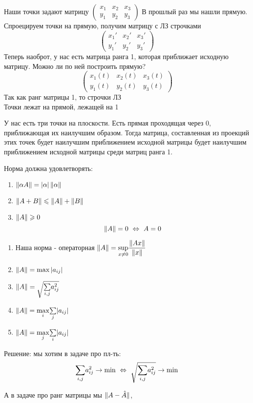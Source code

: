 \documentclass[12pt, fleqn]{article}
\begin{document}
\begin{remark}
    Наши точки задают матрицу $\begin{pmatrix}
        x_1 & x_2 & x_3\\
        y_1 & y_2 & y_3
    \end{pmatrix}$
    В прошлый раз мы нашли прямую. Спроецируем точки на прямую, получим матрицу с ЛЗ строчками
    \[\begin{pmatrix}
        x_1' & x_2' & x_3'\\
        y_1' & y_2' & y_3'
    \end{pmatrix}\]
    Теперь наоброт, у нас есть матрица ранга 1, которая приближает исходную матрицу. Можно ли по ней построить прямую?
    \[\begin{pmatrix}
        x_1(t) & x_2(t) & x_3(t)\\
        y_1(t) & y_2(t) & y_3(t)
    \end{pmatrix}\]
    Так как ранг матрицы 1, то строчки ЛЗ\\
    Точки лежат на прямой, лежащей на 1
\end{remark}

\begin{task}
    У нас есть три точки на плоскости. Есть прямая проходящая через 0, приближающая их наилучшим образом. Тогда матрица, составленная из проекций этих точек будет наилучшим приближением исходной матрицы будет наилучшим приближением исходной матрицы среди матриц ранга 1.

    Норма должна удовлетворять:
    \begin{enumerate}
      \item $\lVert \alpha A \rVert = \left|\alpha\right| \lVert \alpha \rVert$
      \item $\lVert A + B \rVert \leqslant \lVert A \rVert + \lVert B \rVert$
      \item $\lVert A \rVert \geqslant 0$
      \[\lVert A \rVert = 0 \ \Leftrightarrow\ A = 0\]
    \end{enumerate}

    \begin{enumerate}
      \item Наша норма - операторная $\lVert A \rVert = \underset{x \neq 0}{\sup} \dfrac{\lVert Ax \rVert}{\lVert x \rVert}$
      \item $\lVert A \rVert = \max \left|a_{ij}\right|$
      \item $\lVert A \rVert = \sqrt{\underset{i,j}{\sum} a_{ij}^2}$
      \item $\lVert A \rVert = \underset{i}{\max} \underset{j}{\sum} |a_{ij}|$
      \item $\lVert A \rVert = \underset{j}{\max} \underset{i}{\sum} |a_{ij}|$
    \end{enumerate}

    Решение: мы хотим в задаче про пл-ть:\\
    \[\us{i,j}{\sum} a_{ij}^2 \ra \min \ \lra \ \sqrt{\us{i,j}{\sum} a_{ij}^2} \ra \min\]

    А в задаче про ранг матрицы мы $\lVert A - \hat{A} \rVert$,

\end{task}
\end{document}
